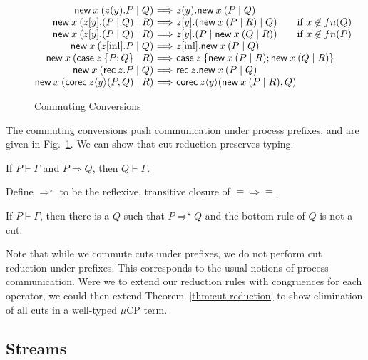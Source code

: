 \documentclass[orivec,envcountsame]{llncs}
\makeatletter
\newcommand{\cptyp}[2]{#1 \vdash #2}
\newcommand{\mkwd}[1]{\mathsf{#1}}
\newcommand{\cut}[4]{\mkwd{new}\:#1 \: (#3 \mid #4)}
\newcommand{\rec}[1]{\mkwd{rec}\:#1}
\newcommand{\corec}[5]{\mkwd{corec}\:#1 \langle #2 \rangle (#4,#5)}
\newcommand{\clabel}[1]{\mathrm{#1}}
\renewcommand{\case}[2]{\mkwd{case}\:#1\:\{#2\}}
\newcommand{\sel}[2]{#1[\clabel{#2}]}
\newcommand{\mucp}{$\mu\mathrm{CP}$\xspace}
\newcommand{\ba}{\begin{array}}
\newcommand{\ea}{\end{array}}
\newenvironment{equations}{\[\ba{@{}r@{~}c@{~}l@{}}}{\ea\]}
\makeatother
\begin{document}
\begin{figure}[float]
\small
\begin{equations}
  \cut{x}{A}{z(y).P}{Q} &\Longrightarrow& z(y).\cut{x}{A}{P}{Q} \\
  \cut{x}{A}{z[y].(P \mid Q)}{R} &\Longrightarrow& z[y].(\cut{x}{A}{P}{R} \mid Q) \text{\quad \quad if $x \not\in fn(Q)$} \\
  \cut{x}{A}{z[y].(P \mid Q)}{R} &\Longrightarrow& z[y].(P \mid \cut{x}{A}{Q}{R}) \text{\quad \quad if $x \not\in fn(P)$} \\
  \cut{x}{A}{\sel{z}{inl}.P}{Q} &\Longrightarrow& \sel{z}{inl}.\cut{x}{A}{P}{Q} \\
  \cut{x}{A}{\case{z}{P;Q}}{R} &\Longrightarrow& \case{z}{\cut{x}{A}{P}{R}; \cut{x}{A}{Q}{R}} \\
  \cut{x}{A}{\rec{z}.P}{Q} &\Longrightarrow& \rec{z}.\cut{x}{A}{P}{Q} \\
  \cut{x}{A}{\corec{z}{y}{B}{P}{Q}}{R} &\Longrightarrow& \corec{z}{y}{B}{\cut{x}{A}{P}{R}}{Q}
\end{equations}
\caption{Commuting Conversions}\label{fig:commuting}
\end{figure}

The commuting conversions push communication under process prefixes, and are given in
Fig.~\ref{fig:commuting}.  We can show that cut reduction preserves typing.

\begin{theorem}
  If $\cptyp{P}{\Gamma}$ and $P \Longrightarrow Q$, then $\cptyp{Q}{\Gamma}.$
\end{theorem}

Define $\Longrightarrow^\star$ to be the reflexive, transitive closure of $\equiv\Longrightarrow\equiv$.

\begin{theorem}\label{thm:cut-reduction}
  If $\cptyp{P}{\Gamma}$, then there is a $Q$ such that $P \Longrightarrow^\star Q$ and the bottom
  rule of $Q$ is not a cut.
\end{theorem}

Note that while we commute cuts under prefixes, we do not perform cut reduction under prefixes.
This corresponds to the usual notions of process communication.  Were we to extend our reduction
rules with congruences for each operator, we could then extend Theorem~\ref{thm:cut-reduction} to
show elimination of all cuts in a well-typed \mucp term.

\subsection{Streams}
\end{document}
